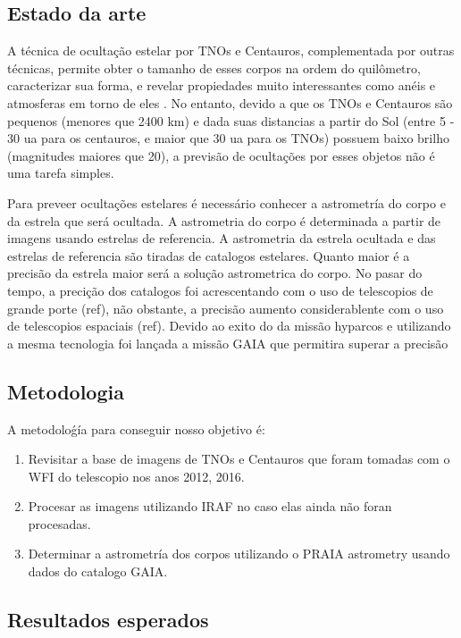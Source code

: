 \documentclass[a4paper, 11pt]{article}
\begin{document}
\subsection{Estado da arte}

A técnica de ocultação estelar por TNOs e Centauros, complementada por outras técnicas, permite obter o tamanho de esses corpos na ordem do quilômetro, caracterizar sua forma, e revelar propiedades muito interessantes como anéis \citep{2017Natur.550..219O, 2014AGUFM.P43F..01B} e atmosferas em torno de eles \citep{1538-3881-136-5-1757, 2006Natur.439...52S}. No entanto, devido a que os TNOs e Centauros são pequenos (menores que 2400 km) e dada suas distancias a partir do Sol (entre  5 - 30 ua para os centauros, e maior que 30 ua para os TNOs) possuem baixo brilho (magnitudes maiores que 20), a previsão de ocultações por esses objetos não é uma tarefa simples. 

Para preveer ocultações estelares é necessário conhecer a astrometría do corpo e da estrela que será ocultada. A astrometria do corpo é determinada a partir de imagens usando estrelas de referencia. A astrometria da estrela ocultada e das estrelas de referencia são tiradas de catalogos estelares. Quanto maior é a precisão da estrela maior será a solução astrometrica do corpo. No pasar do tempo, a precição dos catalogos foi acrescentando com o uso de telescopios de grande porte (ref), não obstante, a precisão aumento considerablente com o uso de telescopios espaciais (ref). Devido ao exito do da missão hyparcos e utilizando a mesma tecnologia foi lançada a missão GAIA que permitira superar a precisão       


\subsection{Metodologia}

A metodoloǵía para conseguir nosso objetivo é:

\begin{enumerate}
  \item Revisitar a base de imagens de TNOs e Centauros que foram tomadas com o WFI do telescopio nos anos 2012, 2016.
  \item Procesar as imagens utilizando IRAF no caso elas ainda não foran procesadas.
  \item Determinar a astrometría dos corpos utilizando o PRAIA astrometry usando dados do catalogo GAIA.
\end{enumerate}

\subsection{Resultados esperados}
\end{document}
